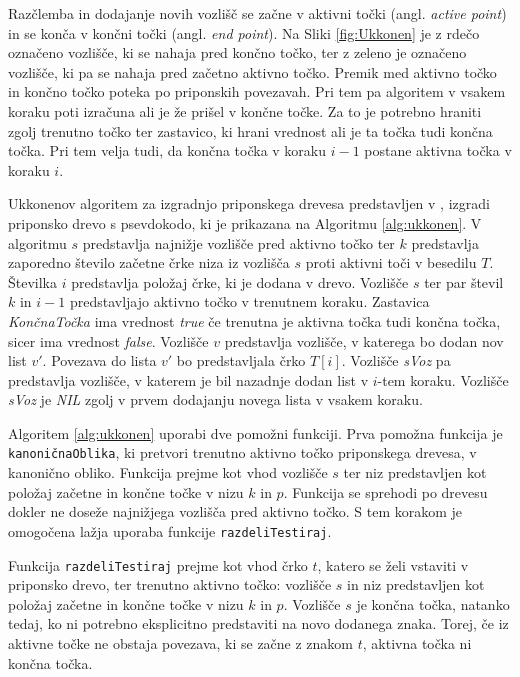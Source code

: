 Razčlemba in dodajanje novih vozlišč se začne v aktivni točki (angl. \textit{active point}) in se konča v končni točki (angl. \textit{end point}). Na Sliki \ref{fig:Ukkonen} je z rdečo označeno vozlišče, ki se nahaja pred končno točko, ter z zeleno je označeno vozlišče, ki pa se nahaja pred začetno aktivno točko. Premik med aktivno točko in končno točko poteka po priponskih povezavah. Pri tem pa algoritem v vsakem koraku poti izračuna ali je že prišel v končne točke. Za to je potrebno hraniti zgolj trenutno točko ter zastavico, ki hrani vrednost ali je ta točka tudi končna točka. Pri tem velja tudi, da končna točka v koraku $i-1$ postane aktivna točka v koraku $i$. 

Ukkonenov algoritem za izgradnjo priponskega drevesa predstavljen v \cite{Ukkonen1995}, izgradi priponsko drevo s psevdokodo, ki je prikazana na Algoritmu \ref{alg:ukkonen}.
V algoritmu $s$ predstavlja najnižje vozlišče pred aktivno točko ter $k$ predstavlja zaporedno število začetne črke niza iz vozlišča $s$ proti aktivni toči v besedilu $T$. Številka $i$ predstavlja položaj črke, ki je dodana v drevo. Vozlišče $s$ ter par števil $k$ in $i-1$ predstavljajo aktivno točko v trenutnem koraku. Zastavica \textit{KončnaTočka} ima vrednost \textit{true} če trenutna je aktivna točka tudi končna točka, sicer ima vrednost \textit{false}. Vozlišče $v$ predstavlja vozlišče, v katerega bo dodan nov list $v'$. Povezava do lista $v'$ bo predstavljala črko $T[i]$. Vozlišče \textit{sVoz} pa predstavlja vozlišče, v katerem je bil nazadnje dodan list v $i$-tem koraku. Vozlišče \textit{sVoz} je \textit{NIL} zgolj v prvem dodajanju novega lista v vsakem koraku.


Algoritem \ref{alg:ukkonen} uporabi dve pomožni funkciji. Prva pomožna funkcija je \texttt{kanoničnaOblika}, ki pretvori trenutno aktivno točko priponskega drevesa, v kanonično obliko. Funkcija prejme kot vhod vozlišče $s$ ter niz predstavljen kot položaj začetne in končne točke v nizu $k$ in $p$. Funkcija se sprehodi po drevesu dokler ne doseže najnižjega vozlišča pred aktivno točko. S tem korakom je omogočena lažja uporaba funkcije \texttt{razdeliTestiraj}.

Funkcija \texttt{razdeliTestiraj} prejme kot vhod črko $t$, katero se želi vstaviti v priponsko drevo, ter trenutno aktivno točko: vozlišče $s$ in niz predstavljen kot položaj začetne in končne točke v nizu $k$ in $p$. Vozlišče $s$ je končna točka, natanko tedaj, ko ni potrebno eksplicitno predstaviti na novo dodanega znaka. Torej, če iz aktivne točke ne obstaja povezava, ki se začne z znakom $t$, aktivna točka ni končna točka.

